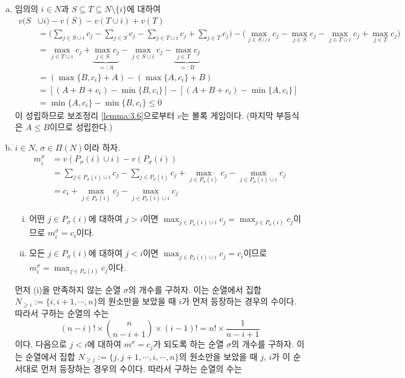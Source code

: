 \documentclass{article}
\numberwithin{equation}{section}
\begin{document}
\begin{sol}
	\begin{enumerate}[(a)]
		\item 임의의 $i\in N$과 $S\subseteq T\subseteq N\setminus\{i\}$에 대하여
			\[
				\begin{aligned}
					v(S&\cup i)-v(S)-v(T\cup i)+v(T)\\
					&=\biggl(\sum_{j\in S\cup i}c_j-\sum_{j\in S}c_j-\sum_{j\in T\cup i}c_j+\sum_{j\in T}c_j\biggr)-\biggl(\max_{j\in S\cup i}c_j-\max_{j\in S}c_j-\max_{j\in T\cup i}c_j+\max_{j\in T}c_j\biggr)\\
					&=\max_{j\in T\cup i}c_j+\underbrace{\max_{j\in S}c_j}_{=:A}-\max_{j\in S\cup i}c_j-\underbrace{\max_{j\in T}c_j}_{=:B}\\
					&=(\max\{B,c_i\}+A)-(\max\{A,c_i\}+B)\\
					&=[(A+B+c_i)-\min\{B,c_i\}]-[(A+B+c_i)-\min\{A,c_i\}]\\
					&=\min\{A,c_i\}-\min\{B,c_i\}\leq0
				\end{aligned}
			\]
			이 성립하므로 보조정리 \ref{lemma:3.6}으로부터 $v$는 볼록 게임이다. (마지막 부등식은 $A\leq B$이므로 성립한다.)
		\item $i\in N$, $\sigma\in\Pi(N)$이라 하자.
			\[
				\begin{aligned}
					m_i^\sigma&=v(P_\sigma(i)\cup i)-v(P_\sigma(i))\\
					&=\sum_{j\in P_\sigma(i)\cup i}c_j-\sum_{j\in P_\sigma(i)}c_j+\max_{j\in P_\sigma(i)}c_j-\max_{j\in P_\sigma(i)\cup i}c_j\\
					&=c_i+\max_{j\in P_\sigma(i)}c_j-\max_{j\in P_\sigma(i)\cup i}c_j
				\end{aligned}
			\]
			\begin{enumerate}[(i)]
				\item 어떤 $j\in P_\sigma(i)$에 대하여 $j>i$이면 $\max_{j\in P_\sigma(i)\cup i}c_j=\max_{j\in P_\sigma(i)}c_j$이므로 $m_i^\sigma=c_i$이다.
				\item 모든 $j\in P_\sigma(i)$에 대하여 $j<i$이면 $\max_{j\in P_\sigma(i)\cup i}c_j=c_i$이므로 $m_i^\sigma=\max_{j\in P_\sigma(i)}c_j$이다.
			\end{enumerate}
			먼저 (i)을 만족하지 않는 순열 $\sigma$의 개수를 구하자. 이는 순열에서 집합 $N_{\geq i}:=\{i,i+1,\cdots,n\}$의 원소만을 보았을 때 $i$가 먼저 등장하는 경우의 수이다. 따라서 구하는 순열의 수는
			\[
				(n-i)!\times\binom{n}{n-i+1}\times(i-1)!=n!\times\frac{1}{n-i+1}
			\]
			이다. 다음으로 $j<i$에 대하여 $m^\sigma=c_j$가 되도록 하는 순열 $\sigma$의 개수를 구하자. 이는 순열에서 집합 $N_{\geq j}:=\{j,j+1,\cdots,i,\cdots,n\}$의 원소만을 보았을 때 $j$, $i$가 이 순서대로 먼저 등장하는 경우의 수이다. 따라서 구하는 순열의 수는

\end{enumerate}
\end{sol}
\end{document}
